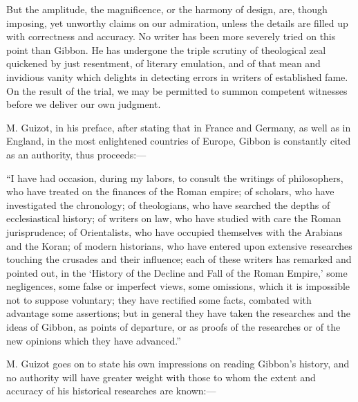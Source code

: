 But the amplitude, the magnificence, or the harmony of design, are, though
imposing, yet unworthy claims on our admiration, unless the details are filled
up with correctness and accuracy. No writer has been more severely tried on
this point than Gibbon. He has undergone the triple scrutiny of theological
zeal quickened by just resentment, of literary emulation, and of that mean
and invidious vanity which delights in detecting errors in writers of
established fame. On the result of the trial, we may be permitted to summon
competent witnesses before we deliver our own judgment.

M. Guizot, in his preface, after stating that in France and Germany, as well
as in England, in the most enlightened countries of Europe, Gibbon is
constantly cited as an authority, thus proceeds:—

“I have had occasion, during my labors, to consult the writings of philosophers,
who have treated on the finances of the Roman empire; of scholars, who have
investigated the chronology; of theologians, who have searched the depths of
ecclesiastical history; of writers on law, who have studied with care the
Roman jurisprudence; of Orientalists, who have occupied themselves with the
Arabians and the Koran; of modern historians, who have entered upon extensive
researches touching the crusades and their influence; each of these writers
has remarked and pointed out, in the ‘History of the Decline and Fall of the
Roman Empire,’ some negligences, some false or imperfect views, some omissions,
which it is impossible not to suppose voluntary; they have rectified some facts,
combated with advantage some assertions; but in general they have taken the
researches and the ideas of Gibbon, as points of departure, or as proofs of
the researches or of the new opinions which they have advanced.”

M. Guizot goes on to state his own impressions on reading Gibbon’s history,
and no authority will have greater weight with those to whom the extent and
accuracy of his historical researches are known:—


